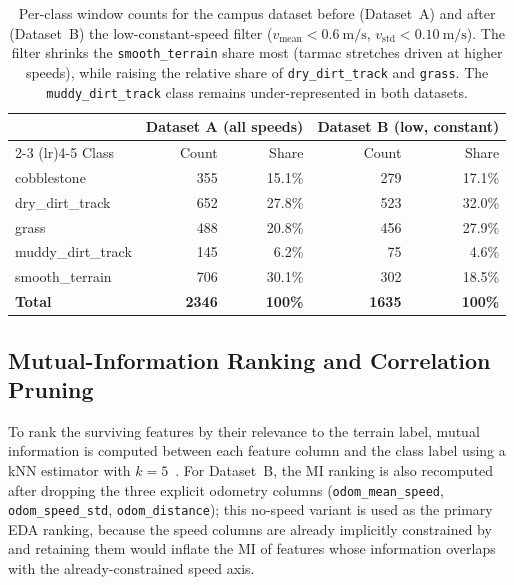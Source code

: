 \begin{table}[H]
    \centering
    \begin{tabular}{lrrrr}
        \toprule
                            & \multicolumn{2}{c}{Dataset A (all speeds)} & \multicolumn{2}{c}{Dataset B (low, constant)} \\
        \cmidrule(lr){2-3} \cmidrule(lr){4-5}
        Class               & Count & Share & Count & Share \\
        \midrule
        cobblestone         & 355   & 15.1\% & 279   & 17.1\% \\
        dry\_dirt\_track    & 652   & 27.8\% & 523   & 32.0\% \\
        grass               & 488   & 20.8\% & 456   & 27.9\% \\
        muddy\_dirt\_track  & 145   & 6.2\%  & 75    & 4.6\%  \\
        smooth\_terrain     & 706   & 30.1\% & 302   & 18.5\% \\
        \midrule
        \textbf{Total}      & \textbf{2346} & \textbf{100\%} & \textbf{1635} & \textbf{100\%} \\
        \bottomrule
    \end{tabular}
    \caption{Per-class window counts for the campus dataset before (Dataset~A) and after (Dataset~B) the low-constant-speed filter ($v_{\mathrm{mean}} < \SI{0.6}{\meter\per\second}$, $v_{\mathrm{std}} < \SI{0.10}{\meter\per\second}$). The filter shrinks the \texttt{smooth\_terrain} share most (tarmac stretches driven at higher speeds), while raising the relative share of \texttt{dry\_dirt\_track} and \texttt{grass}. The \texttt{muddy\_dirt\_track} class remains under-represented in both datasets.}
    \label{tab:dataset_AB_counts}
\end{table}

\vspace{-6mm}
\subsection{Mutual-Information Ranking and Correlation Pruning}
\label{sec:feat_mi_pruning}

To rank the surviving features by their relevance to the terrain label, mutual information is computed between each feature column and the class label using a kNN estimator with $k = 5$~\cite{Kraskov2004}. For Dataset~B, the MI ranking is also recomputed after dropping the three explicit odometry columns (\texttt{odom\_mean\_speed}, \texttt{odom\_speed\_std}, \texttt{odom\_distance}); this no-speed variant is used as the primary EDA ranking, because the speed columns are already implicitly constrained by  and retaining them would inflate the MI of features whose information overlaps with the already-constrained speed axis.

